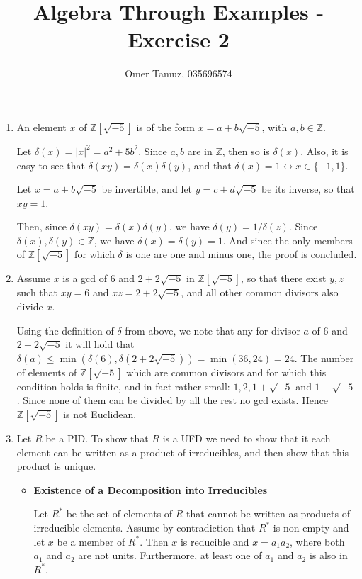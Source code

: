 \documentclass[11pt]{article} \usepackage{amssymb}
\newcommand{\Z}{\mathbb Z} \newcommand{\CalE}{{\mathcal{E}}}
\begin{document}
\title{Algebra Through Examples - Exercise 2}

 \author{Omer Tamuz, 035696574}
\maketitle


\begin{enumerate}
  \item An element $x$ of $\Z[\sqrt{-5}]$ is of the form $x=a+b\sqrt{-5}$, with $a,b\in\Z$. 

    Let $\delta(x)=|x|^2=a^2+5b^2$. Since $a,b$ are in $\Z$, then so is $\delta(x)$. Also,
    it is easy to see that $\delta(xy)=\delta(x)\delta(y)$, and that 
    $\delta(x)=1\leftrightarrow x\in\{-1,1\}$.

    Let
    $x=a+b\sqrt{-5}$ be invertible, and let $y=c+d\sqrt{-5}$ be its inverse, 
    so that $xy=1$. 
    

    Then, since $\delta(xy)=\delta(x)\delta(y)$,
    we have $\delta(y)=1/\delta(z)$. Since $\delta(x),\delta(y)\in\Z$, we have 
    $\delta(x)=\delta(y)=1$. And since the only members of $\Z[\sqrt{-5}]$
    for which $\delta$ is one are one and minus one, the proof is concluded.
    
  \item Assume $x$ is a gcd of $6$ and $2+2\sqrt{-5}$ in $\Z[\sqrt{-5}]$, so that there exist
    $y,z$ such that $xy=6$
    and $xz=2+2\sqrt{-5}$, and all other common divisors also divide $x$.


    Using the definition of $\delta$ from above, we note that any for divisor $a$
    of $6$ and $2+2\sqrt{-5}$ it will hold that 
    $\delta(a)\leq \min(\delta(6),\delta(2+2\sqrt{-5}))=\min(36,24)=24$. The number of elements of 
    $\Z[\sqrt{-5}]$ which are common divisors and for which this condition holds is 
    finite, and in fact
    rather small: $1,2,1+\sqrt{-5}$ and $1-\sqrt{-5}$. Since none of them can be divided
    by all the rest no gcd exists. Hence $\Z[\sqrt{-5}]$ is not Euclidean.

  \item Let $R$ be a PID.  To show that $R$ is a UFD we need to show that
    it each element can be written as a product of irreducibles, and then
    show that this product is unique.

    \begin{itemize}
    \item {\bf Existence of a Decomposition into Irreducibles}

      Let $R^*$ be the set of elements of $R$ that cannot be written as products
      of irreducible elements.
      Assume by contradiction that $R^*$ is non-empty and let $x$ be a member
      of $R^*$.
      Then $x$ is reducible and $x=a_1a_2$, where both $a_1$ and $a_2$ are not 
      units. Furthermore, at least one of $a_1$ and $a_2$ is also in $R^*$.


\end{itemize}
\end{enumerate}
\end{document}
